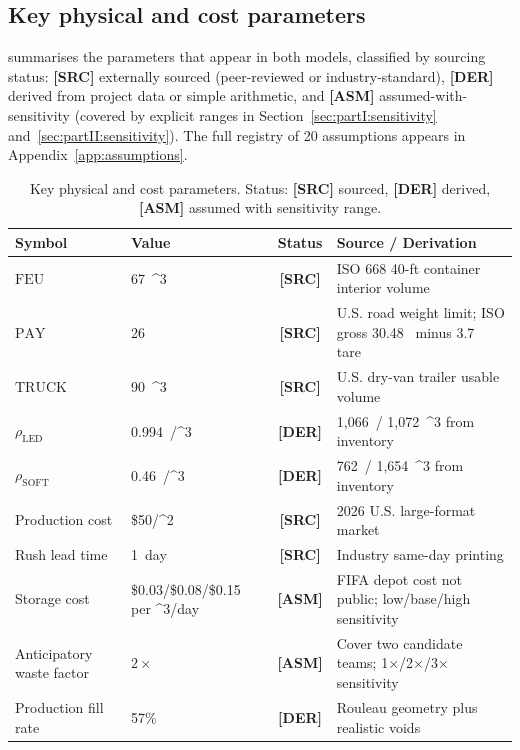 \documentclass[11pt,a4paper]{article}
\numberwithin{equation}{section}
\newcommand{\USD}[1]{\$#1}
\newcommand{\mcube}{\text{m}^{3}}
\newcommand{\msq}{\text{m}^{2}}
\newcommand{\tonne}{\text{t}}
\newcommand{\statusSourced}{{\color{LimeFIFA!70!NavyFIFA}\bfseries\textsf{[SRC]}}}
\newcommand{\statusDerived}{{\color{BlueFIFA}\bfseries\textsf{[DER]}}}
\newcommand{\statusAssumed}{{\color{RedFIFA}\bfseries\textsf{[ASM]}}}
\begin{document}
\subsection{Key physical and cost parameters}\label{sec:data:parameters}

 summarises the parameters that appear in both models, classified by sourcing status: \statusSourced{} externally sourced (peer-reviewed or industry-standard), \statusDerived{} derived from project data or simple arithmetic, and \statusAssumed{} assumed-with-sensitivity (covered by explicit ranges in Section~\ref{sec:partI:sensitivity} and~\ref{sec:partII:sensitivity}). The full registry of 20 assumptions appears in Appendix~\ref{app:assumptions}.

\begin{table}[h]
\centering
\small
\caption{Key physical and cost parameters. Status: \statusSourced{} sourced, \statusDerived{} derived, \statusAssumed{} assumed with sensitivity range.}
\label{tab:params}
\begin{tabularx}{\textwidth}{@{}l l c X@{}}
\toprule
\textbf{Symbol} & \textbf{Value} & \textbf{Status} & \textbf{Source / Derivation} \\
\midrule
$\mathrm{FEU}$ & 67~\mcube{} & \statusSourced{} & ISO 668 40-ft container interior volume \cite{iso_container} \\
$\mathrm{PAY}$ & 26~\tonne{} & \statusSourced{} & U.S. road weight limit; ISO gross 30.48~\tonne{} minus 3.7~\tonne{} tare \cite{fmcsa_weight} \\
$\mathrm{TRUCK}$ & 90~\mcube{} & \statusSourced{} & U.S. dry-van trailer usable volume \\
$\rho_{\mathrm{LED}}$ & 0.994~\tonne/\mcube & \statusDerived{} & 1{,}066~\tonne / 1{,}072~\mcube{} from inventory \\
$\rho_{\mathrm{SOFT}}$ & 0.46~\tonne/\mcube & \statusDerived{} & 762~\tonne / 1{,}654~\mcube{} from inventory \\
Production cost & \USD{50}/\msq{} & \statusSourced{} & 2026 U.S. large-format market \cite{costhack_printing} \\
Rush lead time & 1~day & \statusSourced{} & Industry same-day printing \cite{signsnyc_rush} \\
Storage cost & \USD{0.03}/\USD{0.08}/\USD{0.15} per \mcube/day & \statusAssumed{} & FIFA depot cost not public; low/base/high sensitivity \\
Anticipatory waste factor & $2\times$ & \statusAssumed{} & Cover two candidate teams; 1$\times$/2$\times$/3$\times$ sensitivity \\
Production fill rate & 57\% & \statusDerived{} & Rouleau geometry plus realistic voids \\
\bottomrule
\end{tabularx}
\end{table}
\end{document}
